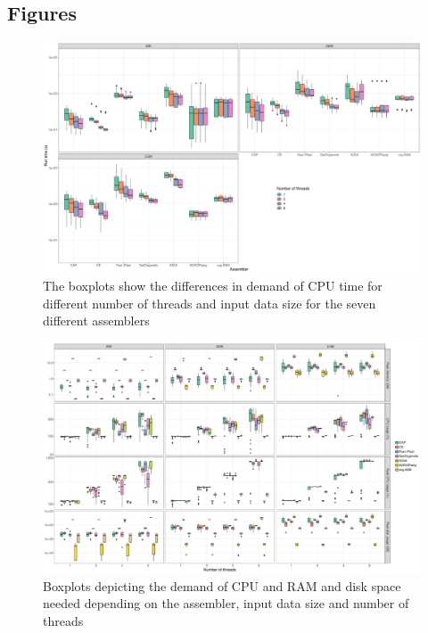 \documentclass{bmcart}
\begin{document}
\begin{backmatter}
\section*{Figures}
\begin{figure}[h!]
  \includegraphics[width=\textwidth]{plots/comp_time_log.pdf}
  \caption{
  The boxplots show the differences in demand of CPU time for different number of threads and input data size for the seven different assemblers
  }
        \label{fig:performance_runtime}
      \end{figure}

\begin{figure}[h!]
  \includegraphics[width=\textwidth]{plots/usage_amount_threads.pdf}
  \caption{
      Boxplots depicting the demand of CPU and RAM and disk space needed depending on the assembler, input data size and number of threads}
      \label{fig:performance_memory_cpu}
      \end{figure}


\end{backmatter}
\end{document}

